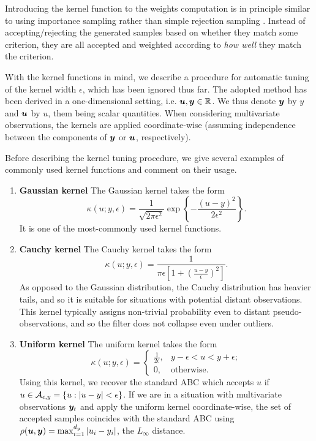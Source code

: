 Introducing the kernel function to the weights computation is in principle similar to using importance sampling rather than simple rejection sampling \citep{information-theory}. Instead of accepting/rejecting the generated samples based on whether they match some criterion, they are all accepted and weighted according to \emph{how well} they match the criterion.

With the kernel functions in mind, we describe a procedure for automatic tuning of the kernel width $\epsilon$, which has been ignored thus far. The adopted method has been derived in a one-dimensional setting, i.e. $\bm{u}, \bm{y} \in \mathbb{R}$. We thus denote $\bm{y}$ by $y$ and $\bm{u}$ by $u$, them being scalar quantities. When considering multivariate observations, the kernels are applied coordinate-wise (assuming independence between the components of $\bm{y}$ or $\bm{u}$, respectively).

Before describing the kernel tuning procedure, we give several examples of commonly used kernel functions and comment on their usage.
\begin{enumerate}
    \item \textbf{Gaussian kernel} The Gaussian kernel takes the form
    \begin{equation*}
    \kappa(u; y, \epsilon) = \frac{1}{\sqrt{2 \pi \epsilon^2}} \exp \left\{-\frac{\left(u - y\right)^2}{2 \epsilon^2}\right\}.
    \end{equation*}
    It is one of the most-commonly used kernel functions.
    \item \textbf{Cauchy  kernel} The Cauchy kernel takes the form
    \begin{equation*}
    \kappa(u; y, \epsilon) = \frac{1}{\pi \epsilon \left[ 1 + \left(\frac{u - y}{\epsilon}\right)^2 \right]}.
    \end{equation*}
    As opposed to the Gaussian distribution, the Cauchy distribution has heavier tails, and so it is suitable for situations with potential distant observations. This kernel typically assigns non-trivial probability even to distant pseudo-observations, and so the filter does not collapse even under outliers.
    
    \item \textbf{Uniform kernel} The uniform kernel takes the form
    \begin{equation*}
    \kappa(u; y, \epsilon) = \begin{cases}
    \frac{1}{2 \epsilon}, & y - \epsilon < u < y + \epsilon; \\
    0, & \text{otherwise}.
    \end{cases}
    \end{equation*}
    Using this kernel, we recover the standard ABC which accepts $u$ if $u \in \mathcal{A}_{\epsilon, y} = \left\{u : \left| u - y \right| < \epsilon \right\}$. If we are in a situation with multivariate observations $\bm{y}_t$ and apply the uniform kernel coordinate-wise, the set of accepted samples coincides with the standard ABC using $\rho(\bm{u}, \bm{y}) = \max_{i=1}^{d_y} \left|u_i - y_i\right|$, the $L_\infty$ distance.
\end{enumerate}


